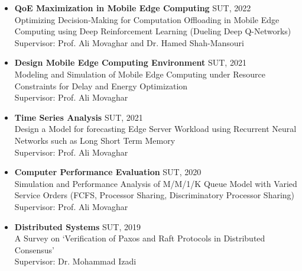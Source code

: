 \documentclass[11pt]{article}
\begin{document}
\begin{itemize}
	
	
		
	\item \textbf{QoE Maximization in Mobile Edge Computing} \hfill SUT, 2022\\
	Optimizing Decision-Making for Computation Offloading in Mobile Edge Computing using Deep Reinforcement Learning (Dueling Deep Q-Networks) \href{https://github.com/ImanRHT/QOCO}{\faGithub} \\
	Supervisor: Prof.  Ali Movaghar and Dr. Hamed Shah-Mansouri \href{https://scholar.google.com/citations?user=dcjIFccAAAAJ&hl=en&oi=ao}{\small \faExternalLink} 
	
	
	\item \textbf{Design Mobile Edge Computing Environment} \hfill SUT, 2021\\
	Modeling and Simulation of Mobile Edge Computing under Resource Constraints for Delay and Energy Optimization \href{https://github.com/ImanRHT/MEC_Environment}{\faGithub} \\
	Supervisor: Prof.  Ali Movaghar
	


	
	\item \textbf{Time Series Analysis} \hfill SUT, 2021\\
	Design a Model for forecasting Edge Server Workload using Recurrent Neural Networks such as Long Short Term Memory
	\href{https://github.com/ImanRHT/Tiime_Series_Prediction}{\faGithub} \\
	Supervisor: Prof.  Ali Movaghar
	
	\item \textbf{Computer Performance Evaluation} \hfill SUT, 2020\\
	Simulation and Performance Analysis of M/M/1/K Queue Model with Varied Service Orders (FCFS, Processor Sharing, Discriminatory Processor Sharing) \href{https://github.com/ImanRHT/MM1K_Queue_Simulation}{\faGithub} \\
	Supervisor: Prof.  Ali Movaghar
	


	\item \textbf{Distributed Systems} \hfill SUT, 2019\\
	A Survey on `Verification of Paxos and Raft Protocols in Distributed Consensus’ \\
	Supervisor: Dr. Mohammad Izadi	\href{https://scholar.google.com/citations?user=On8Cw-MAAAAJ&hl=en&oi=ao}{\small \faExternalLink}



\end{itemize}
\end{document}

